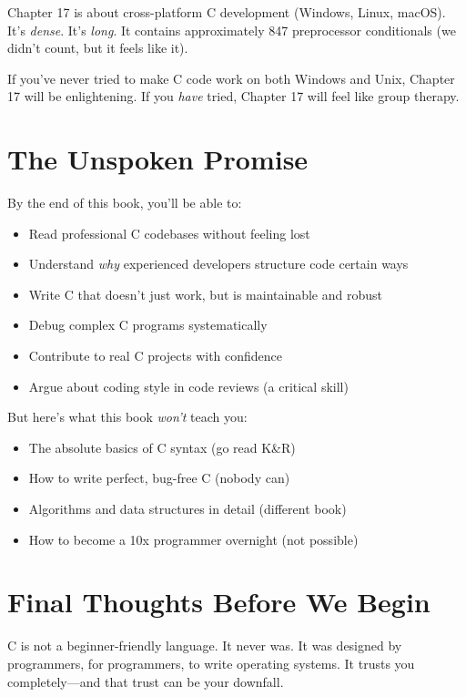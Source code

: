 \documentclass[10pt,openany]{book}
\begin{document}
Chapter 17 is about cross-platform C development (Windows, Linux, macOS). It's \textit{dense}. It's \textit{long}. It contains approximately 847 preprocessor conditionals (we didn't count, but it feels like it).

If you've never tried to make C code work on both Windows and Unix, Chapter 17 will be enlightening. If you \textit{have} tried, Chapter 17 will feel like group therapy.

\section*{The Unspoken Promise}

By the end of this book, you'll be able to:
\begin{itemize}
    \item Read professional C codebases without feeling lost
    \item Understand \textit{why} experienced developers structure code certain ways
    \item Write C that doesn't just work, but is maintainable and robust
    \item Debug complex C programs systematically
    \item Contribute to real C projects with confidence
    \item Argue about coding style in code reviews (a critical skill)
\end{itemize}

But here's what this book \textit{won't} teach you:
\begin{itemize}
    \item The absolute basics of C syntax (go read K\&R)
    \item How to write perfect, bug-free C (nobody can)
    \item Algorithms and data structures in detail (different book)
    \item How to become a 10x programmer overnight (not possible)
\end{itemize}

\section*{Final Thoughts Before We Begin}

C is not a beginner-friendly language. It never was. It was designed by programmers, for programmers, to write operating systems. It trusts you completely---and that trust can be your downfall.
\end{document}
